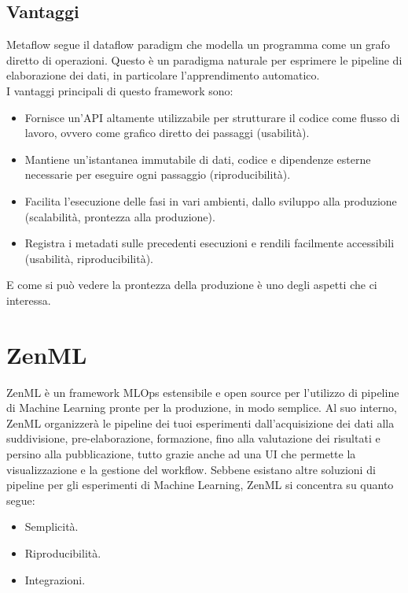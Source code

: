 \documentclass[12pt,a4paper]{report}
\begin{document}
\subsection{Vantaggi}
Metaflow segue il dataflow paradigm che modella un programma come un grafo diretto di operazioni. Questo è un paradigma naturale per esprimere le pipeline di elaborazione dei dati, in particolare l'apprendimento automatico.\\
I vantaggi principali di questo framework sono: \cite{MetaFLow}
\begin{itemize}
    \item Fornisce un'API altamente utilizzabile per strutturare il codice come flusso di lavoro, ovvero come grafico diretto dei passaggi (usabilità).
    \item Mantiene un'istantanea immutabile di dati, codice e dipendenze esterne necessarie per eseguire ogni passaggio (riproducibilità).
    \item Facilita l'esecuzione delle fasi in vari ambienti, dallo sviluppo alla produzione (scalabilità, prontezza alla produzione).
    \item Registra i metadati sulle precedenti esecuzioni e rendili facilmente accessibili (usabilità, riproducibilità).
\end{itemize}

E come si può vedere la prontezza della produzione è uno degli aspetti che ci interessa.

\section{ZenML}
ZenML è un framework MLOps estensibile e open source per l'utilizzo di pipeline di Machine Learning pronte per la produzione, in modo semplice. Al suo interno, ZenML organizzerà le pipeline dei tuoi esperimenti dall'acquisizione dei dati alla suddivisione, pre-elaborazione, formazione, fino alla valutazione dei risultati e persino alla pubblicazione, tutto grazie anche ad una UI che permette la visualizzazione e la gestione del workflow. \cite{ZenML}
Sebbene esistano altre soluzioni di pipeline per gli esperimenti di Machine Learning, ZenML si concentra su quanto segue:
\begin{itemize}
    \item Semplicità.
    \item Riproducibilità.
    \item Integrazioni.
\end{itemize}
\end{document}
